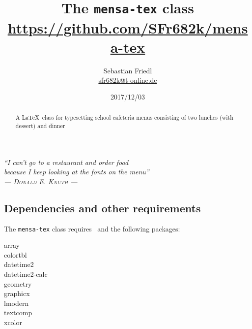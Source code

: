 \documentclass[11pt]{ltxdoc}
\title{The \texttt{mensa-tex} class \\ {\large\url{https://github.com/SFr682k/mensa-tex}}}
\author{Sebastian Friedl \\ \href{mailto:sfr682k@t-online.de}{\ttfamily sfr682k@t-online.de}}
\date{2017/12/03}
\begin{document}
	\maketitle
	\thispagestyle{empty}
	
	\begin{center} \itshape
		\enquote{I can't go to a restaurant and order food \\ because I keep looking at the fonts on the menu} \\
		--- \textsc{\upshape Donald E. Knuth} ---
	\end{center}
	
	\medskip
	\begin{abstract}
		\noindent%
		A \LaTeX\ class for typesetting school cafeteria menus consisting of two lunches (with dessert) and dinner
	\end{abstract}
	
	
	\tableofcontents
	
	\clearpage
	
	

	\subsection*{Dependencies and other requirements}
	The \texttt{mensa-tex} class requires \LaTeXe\ and the following packages:
	\begin{multicols}{3}\ttfamily\centering
		array \\ colortbl \\ datetime2 \\ datetime2-calc \\ geometry \\ graphicx \\ lmodern \\ textcomp \\ xcolor
	\end{multicols}
	
	
\end{document}
